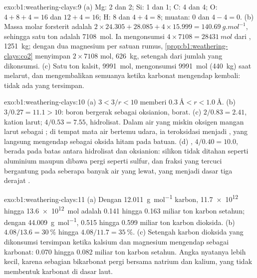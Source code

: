 \begin{solution}{exo:b1:weathering-clays:9}
(a) Mg: 2 dan 2; Si: 1 dan 1; C: 4 dan 4; O: $4 + 8 + 4 = 16$ dan $12 + 4 =
16$; H: 8 dan $4 + 4 = 8$; muatan: 0 dan $4 - 4 = 0$. (b) Massa molar
forsterit adalah $2\times24.305 + 28.085 + 4\times15.999 =
\qty{140.69}{g.mol^{-1}}$, sehingga satu ton adalah \qty{7108}{mol}. Ia mengonsumsi
$4\times7108 = \qty{28431}{mol}$ dari , \qty{1251}{kg}; dengan dua
magnesium per satuan rumus, \cref{prop:b1:weathering-clays:co2} menyimpan
$2\times7108$ mol, \qty{626}{kg}, setengah dari jumlah yang dikonsumsi. (c) Satu ton
kalsit, \qty{9991}{mol}, mengonsumsi \qty{9991}{mol}  (\qty{440}{kg})
saat melarut, dan mengembalikan semuanya ketika karbonat mengendap kembali: tidak
ada yang tersimpan.
\end{solution}

\begin{solution}{exo:b1:weathering-clays:10}
(a) $3 < 3/r < 10$ memberi $\qty{0.3}{\angstrom} < r < \qty{1.0}{\angstrom}$.
(b) $3/0.27 = 11.1 > 10$: boron bergerak sebagai oksianion, borat. (c) $2/0.83 =
2.41$, kation larut; $4/0.53 = 7.55$, hidrolisat. Dalam air yang miskin oksigen
mangan larut sebagai ; di tempat mata air bertemu udara, ia teroksidasi
menjadi , yang langsung mengendap sebagai oksida hitam pada batuan. (d)
, $4/0.40 = 10.0$, berada pada batas antara hidrolisat dan
oksianion: silikon tidak ditahan seperti aluminium maupun dibawa pergi seperti
sulfur, dan fraksi yang tercuci bergantung pada seberapa banyak air yang lewat,
yang menjadi dasar tiga derajat .
\end{solution}

\begin{solution}{exo:b1:weathering-clays:11}
(a) Dengan \qty{12.011}{g.mol^{-1}} karbon, \num{11.7e12} hingga
\qty{13.6e12}{mol} adalah 0.141 hingga 0.163 miliar ton karbon setahun; dengan
\qty{44.009}{g.mol^{-1}}, 0.515 hingga 0.599 miliar ton karbon dioksida.
(b) $4.08/13.6 = \qty{30}{\percent}$ hingga $4.08/11.7 = \qty{35}{\percent}$.
(c) Setengah karbon dioksida yang dikonsumsi tersimpan ketika kalsium dan magnesium
mengendap sebagai karbonat: 0.070 hingga 0.082 miliar ton karbon setahun. Angka
nyatanya lebih kecil, karena sebagian bikarbonat pergi bersama natrium dan kalium,
yang tidak membentuk karbonat di dasar laut.
\end{solution}

